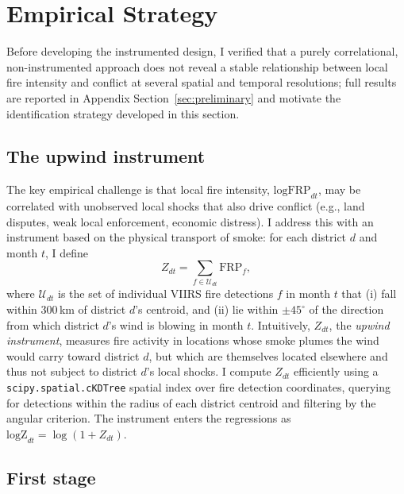 \documentclass[12pt]{article}
\begin{document}
\section{Empirical Strategy}
\label{sec:empirical}

Before developing the instrumented design, I verified that a purely correlational, non-instrumented approach does not reveal a stable relationship between local fire intensity and conflict at several spatial and temporal resolutions; full results are reported in Appendix Section~\ref{sec:preliminary} and motivate the identification strategy developed in this section.

\subsection{The upwind instrument}

The key empirical challenge is that local fire intensity, $\text{logFRP}_{dt}$, may be correlated with unobserved local shocks that also drive conflict (e.g., land disputes, weak local enforcement, economic distress). I address this with an instrument based on the physical transport of smoke: for each district $d$ and month $t$, I define
\[
Z_{dt} = \sum_{f \in \mathcal{U}_{dt}} \text{FRP}_f,
\]
where $\mathcal{U}_{dt}$ is the set of individual VIIRS fire detections $f$ in month $t$ that (i) fall within 300\,km of district $d$'s centroid, and (ii) lie within $\pm 45^{\circ}$ of the direction from which district $d$'s wind is blowing in month $t$. Intuitively, $Z_{dt}$, the \emph{upwind instrument}, measures fire activity in locations whose smoke plumes the wind would carry toward district $d$, but which are themselves located elsewhere and thus not subject to district $d$'s local shocks. I compute $Z_{dt}$ efficiently using a \texttt{scipy.spatial.cKDTree} spatial index over fire detection coordinates, querying for detections within the radius of each district centroid and filtering by the angular criterion. The instrument enters the regressions as $\text{logZ}_{dt} = \log(1+Z_{dt})$.

\subsection{First stage}
\end{document}
